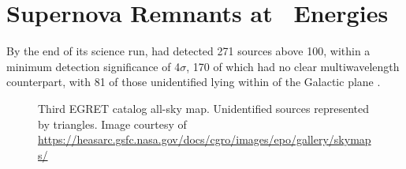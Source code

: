 \section{\label{Rems:latGam}Supernova Remnants at \gam~Energies}
By the end of its science run, \egret{} had detected 271 sources above 100\mev{}, within a minimum detection significance of 4$\sigma$, 170 of which had no clear multiwavelength counterpart, with 81 of those unidentified lying within \blat of the Galactic plane \citep{Hartman99}.

\begin{figure}[h!]%
	\centering
	\caption[Third EGRET catalog all-sky map.]{Third EGRET catalog all-sky map. Unidentified sources represented by triangles. Image courtesy of \url{https://heasarc.gsfc.nasa.gov/docs/cgro/images/epo/gallery/skymaps/}}
	\label{fig:3EGSky} 
\end{figure}

